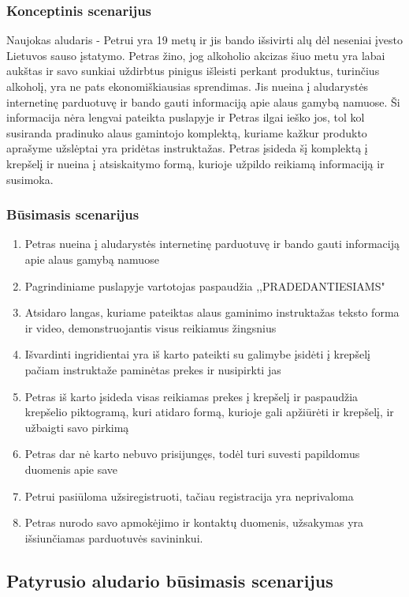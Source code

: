 \documentclass[oneside]{VUMIFPSkursinis}
\begin{document}
		\subsubsection{Konceptinis scenarijus}
			Naujokas aludaris - Petrui yra 19 metų ir jis bando išsivirti alų dėl neseniai įvesto Lietuvos sauso įstatymo.
			Petras žino, jog alkoholio akcizas šiuo metu yra labai aukštas ir savo sunkiai uždirbtus pinigus išleisti perkant produktus, turinčius alkoholį, yra ne pats ekonomiškiausias sprendimas.
			Jis nueina į aludarystės internetinę parduotuvę ir bando gauti informaciją apie alaus gamybą namuose.
			Ši informacija nėra lengvai pateikta puslapyje ir Petras ilgai ieško jos, tol kol susiranda pradinuko alaus gamintojo komplektą, kuriame kažkur produkto aprašyme užslėptai yra pridėtas instruktažas.
			Petras įsideda šį komplektą į krepšelį ir nueina į atsiskaitymo formą, kurioje užpildo reikiamą informaciją ir susimoka.
		\subsubsection{Būsimasis scenarijus}
			\begin{enumerate}
				\item{Petras nueina į aludarystės internetinę parduotuvę ir bando gauti informaciją apie alaus gamybą namuose}
				\item{Pagrindiniame puslapyje vartotojas paspaudžia ,,PRADEDANTIESIAMS"}
				\item{Atsidaro langas, kuriame pateiktas alaus gaminimo instruktažas teksto forma ir video, demonstruojantis visus reikiamus žingsnius}
				\item{Išvardinti ingridientai yra iš karto pateikti su galimybe įsidėti į krepšelį pačiam instruktaže paminėtas prekes ir nusipirkti jas}
				\item{Petras iš karto įsideda visas reikiamas prekes į krepšelį ir paspaudžia krepšelio piktogramą, kuri atidaro formą, kurioje gali apžiūrėti ir krepšelį, ir užbaigti savo pirkimą}
				\item{Petras dar nė karto nebuvo prisijungęs, todėl turi suvesti papildomus duomenis apie save}
				\item{Petrui pasiūloma užsiregistruoti, tačiau registracija yra neprivaloma}
				\item{Petras nurodo savo apmokėjimo ir kontaktų duomenis, užsakymas yra išsiunčiamas parduotuvės savininkui.}
			\end{enumerate}
	\subsection{Patyrusio aludario būsimasis scenarijus}
\end{document}
